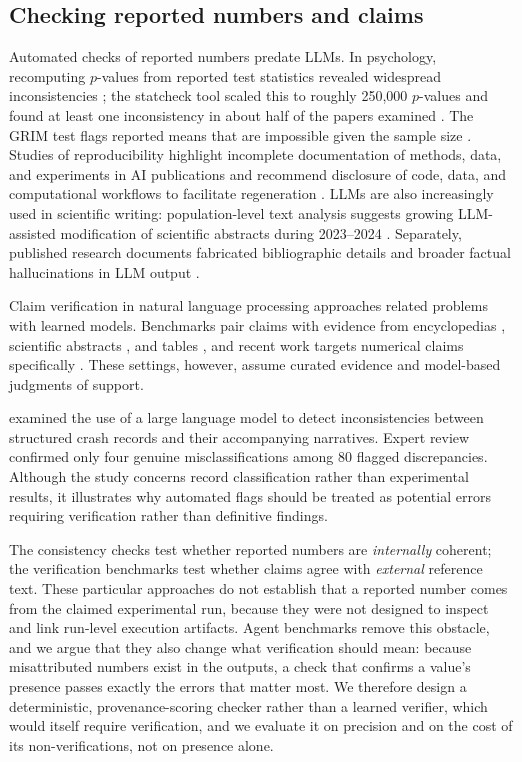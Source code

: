 \documentclass[preprint,12pt,authoryear]{elsarticle}
\begin{document}
\subsection{Checking reported numbers and claims}\label{sec:rw-numbers}

Automated checks of reported numbers predate LLMs. In psychology, recomputing $p$-values from reported test statistics revealed widespread inconsistencies \citep{bakker2011errors}; the statcheck tool scaled this to roughly 250{,}000 $p$-values and found at least one inconsistency in about half of the papers examined \citep{nuijten2016statcheck}. The GRIM test flags reported means that are impossible given the sample size \citep{brown2017grim}. Studies of reproducibility highlight incomplete documentation of methods, data, and experiments in AI publications \citep{gundersen2018reproducibility} and recommend disclosure of code, data, and computational workflows to facilitate regeneration \citep{pineau2021reproducibility,stodden2016reproducibility}. LLMs are also increasingly used in scientific writing: population-level text analysis suggests growing LLM-assisted modification of scientific abstracts during 2023--2024 \citep{liang2024mapping}. Separately, published research documents fabricated bibliographic details \citep{walters2023citations} and broader factual hallucinations in LLM output \citep{huang2025hallucination}.

Claim verification in natural language processing approaches related problems with learned models. Benchmarks pair claims with evidence from encyclopedias \citep{thorne2018fever}, scientific abstracts \citep{wadden2020scifact}, and tables \citep{chen2020tabfact,lu2023scitab}, and recent work targets numerical claims specifically \citep{venktesh2024quantemp}. These settings, however, assume curated evidence and model-based judgments of support.

\citet{jaradat2025crashes} examined the use of a large language model to detect inconsistencies between structured crash records and their accompanying narratives. Expert review confirmed only four genuine misclassifications among 80 flagged discrepancies. Although the study concerns record classification rather than experimental results, it illustrates why automated flags should be treated as potential errors requiring verification rather than definitive findings.

The consistency checks test whether reported numbers are \emph{internally} coherent; the verification benchmarks test whether claims agree with \emph{external} reference text. These particular approaches do not establish that a reported number comes from the claimed experimental run, because they were not designed to inspect and link run-level execution artifacts. Agent benchmarks remove this obstacle, and we argue that they also change what verification should mean: because misattributed numbers exist in the outputs, a check that confirms a value's presence passes exactly the errors that matter most. We therefore design a deterministic, provenance-scoring checker rather than a learned verifier, which would itself require verification, and we evaluate it on precision and on the cost of its non-verifications, not on presence alone.
\end{document}
